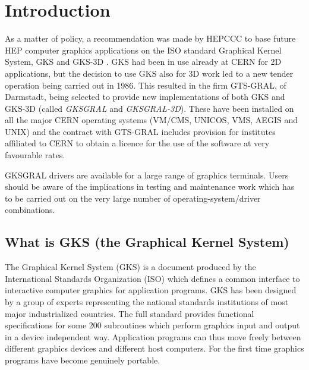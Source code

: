  
\chapter{\protect\label{sec:intro}Introduction}
 
As a matter of policy, a recommendation was made by HEPCCC to base
future HEP computer graphics applications on the ISO standard
Graphical Kernel System,
GKS \cite{bib-gks2d} and GKS-3D \cite{bib-gks3d}.
GKS had been in use already at CERN for 2D applications, but the decision
to use GKS also for 3D work led to a new tender operation
being carried out
in 1986. This resulted in the firm GTS-GRAL, of Darmstadt,
being selected to provide new implementations of both GKS and GKS-3D
(called {\it GKSGRAL} and {\it GKSGRAL-3D}).
These have been installed on all the major CERN
operating systems (VM/CMS, UNICOS, VMS, AEGIS and UNIX) and
the contract with GTS-GRAL includes
provision for institutes affiliated to CERN to obtain a licence for the
use of the software at very favourable rates.
 
GKSGRAL drivers are available for a large range of graphics terminals.
Users should be aware of the implications in testing and maintenance
work which has to be carried out on the very large number of
operating-system/driver combinations.
\section{What is GKS (the Graphical Kernel System)}
The Graphical Kernel System (GKS) \cite{bib-gks2d} is a document produced
by the International Standards Organization (ISO) which defines a common
interface to interactive computer graphics for application programs.
GKS has been designed by a group of experts representing the national
standards institutions of most major industrialized countries.
The full standard provides functional specifications for some
200 subroutines which perform graphics input and output
in a device independent way.
Application programs can thus move freely between different graphics
devices and different host computers.
For the first time graphics programs have become genuinely portable.
 
